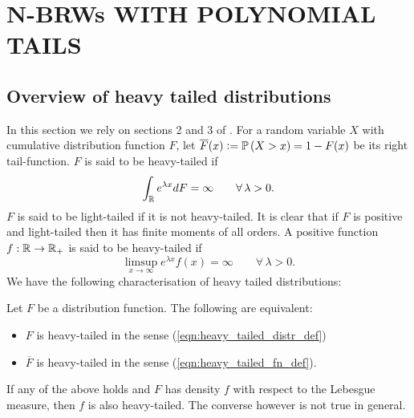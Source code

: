 \section{N-BRWs WITH POLYNOMIAL TAILS}\label{sec:poly}

\subsection{Overview of heavy tailed distributions}\label{sec:heavy_tailed_overview}
In this section we rely on sections 2 and 3 of \cite{foss2011introduction}. For a random variable $X$ with cumulative distribution function $F$, let $\overline{F}(x) \vcentcolon= \mathbb{P} \left( X > x \right) = 1 - F(x)$ be its right tail-function. $F$ is said to be heavy-tailed if 
\begin{equation}\label{eqn:heavy_tailed_distr_def}
\int_{\mathbb{R}} e^{\lambda x} dF = \infty\qquad\forall\, \lambda > 0. 
\end{equation}
$F$ is said to be light-tailed if it is not heavy-tailed. It is clear that if $F$ is positive and light-tailed then it has finite moments of all orders. A positive function $f : \mathbb{R} \to \mathbb{R}_+$ is said to be heavy-tailed if 
\begin{equation}\label{eqn:heavy_tailed_fn_def}
\limsup\limits_{x \to \infty} e^{\lambda x} f(x) = \infty\qquad\forall\,\lambda > 0. 
\end{equation}
We have the following characterisation of heavy tailed distributions:

\begin{theorem}
Let $F$ be a distribution function. The following are equivalent:
\begin{itemize}
\item $F$ is heavy-tailed in the sense (\ref{eqn:heavy_tailed_distr_def})
\item $\overline{F}$ is heavy-tailed in the sense (\ref{eqn:heavy_tailed_fn_def}). 
\end{itemize}
If any of the above holds and $F$ has density $f$ with respect to the Lebesgue measure, then $f$ is also heavy-tailed. The converse however is not true in general. 
\end{theorem}

